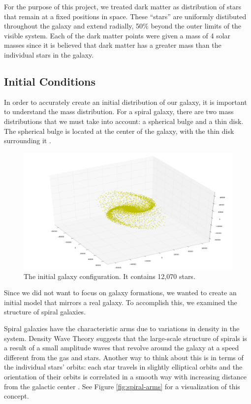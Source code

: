\documentclass{article}
\begin{document}
For the purpose of this project, we treated dark matter as distribution of stars that remain at a fixed positions in space.  These ``stars'' are uniformly distibuted throughout the galaxy and extend radially, 50\% beyond the outer limits of the visible system.  Each of the dark matter points were given a mass of 4 solar masses since it is believed that dark matter has a greater mass than the individual stars in the galaxy.

\subsection{Initial Conditions}

In order to accurately create an initial distribution of our galaxy, it is important to understand the mass distribution.  For a spiral galaxy, there are two mass distributions that we must take into account: a spherical bulge and a thin disk.  The spherical bulge is located at the center of the galaxy, with the thin disk surrounding it \cite{rotation-dynamics}.  

\begin{figure}
\centering
\includegraphics[width=2\columnwidth]{initial-conditions.png}
\caption{The initial galaxy configuration.  It contains 12,070 stars. \label{fig:init-cond}}
\end{figure}

Since we did not want to focus on galaxy formations, we wanted to create an initial model that mirrors a real galaxy.  To accomplish this, we examined the structure of spiral galaxies.  

Spiral galaxies have the characteristic arms due to variations in density in the system.  Density Wave Theory suggests that the large-scale structure of spirals is a result of a small amplitude waves that revolve around the galaxy at a speed different from the gas and stars.  Another way to think about this is in terms of the individual stars' orbits: each star travels in slightly elliptical orbits and the orientation of their orbits is correlated in a smooth way with increasing distance from the galactic center \cite{spiral-arms}.  See Figure \ref{fig:spiral-arms} for a visualization of this concept.  
\end{document}
